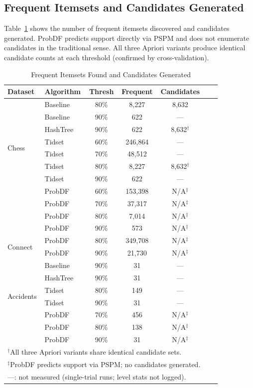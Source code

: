 \documentclass[conference]{IEEEtran}
\begin{document}
\subsection{Frequent Itemsets and Candidates Generated}

Table~\ref{tab:freq} shows the number of frequent itemsets discovered
and candidates generated. ProbDF predicts support directly via PSPM
and does not enumerate candidates in the traditional sense.
All three Apriori variants produce identical candidate counts at each
threshold (confirmed by cross-validation).

\begin{table}[H]
\centering
\caption{Frequent Itemsets Found and Candidates Generated}
\label{tab:freq}
\setlength{\tabcolsep}{2.5pt}
\begin{tabular}{llccccc}
\toprule
\textbf{Dataset} & \textbf{Algorithm} & \textbf{Thresh} & \textbf{Frequent} & \textbf{Candidates} \\
\midrule
\multirow{8}{*}{Chess}
  & Baseline & 80\% & 8,227  & 8,632 \\
  & Baseline & 90\% & 622    & ---   \\
  & HashTree & 90\% & 622    & 8,632$^\dagger$ \\
  & Tidset   & 60\% & 246,864 & --- \\
  & Tidset   & 70\% & 48,512 & --- \\
  & Tidset   & 80\% & 8,227  & 8,632$^\dagger$ \\
  & Tidset   & 90\% & 622    & ---  \\
  & ProbDF   & 60\% & 153,398 & N/A$^\ddagger$ \\
  & ProbDF   & 70\% & 37,317 & N/A$^\ddagger$ \\
  & ProbDF   & 80\% & 7,014  & N/A$^\ddagger$ \\
  & ProbDF   & 90\% & 573    & N/A$^\ddagger$ \\
\midrule
\multirow{2}{*}{Connect}
  & ProbDF & 80\% & 349,708 & N/A$^\ddagger$ \\
  & ProbDF & 90\% & 21,730  & N/A$^\ddagger$ \\
\midrule
\multirow{6}{*}{Accidents}
  & Baseline & 90\% & 31  & --- \\
  & HashTree & 90\% & 31  & --- \\
  & Tidset   & 80\% & 149 & --- \\
  & Tidset   & 90\% & 31  & --- \\
  & ProbDF   & 70\% & 456 & N/A$^\ddagger$ \\
  & ProbDF   & 80\% & 138 & N/A$^\ddagger$ \\
  & ProbDF   & 90\% & 31  & N/A$^\ddagger$ \\
\bottomrule
\multicolumn{5}{l}{\footnotesize $^\dagger$All three Apriori variants share identical candidate sets.} \\
\multicolumn{5}{l}{\footnotesize $^\ddagger$ProbDF predicts support via PSPM; no candidates generated.} \\
\multicolumn{5}{l}{\footnotesize ---: not measured (single-trial runs; level stats not logged).}
\end{tabular}
\end{table}
\end{document}
